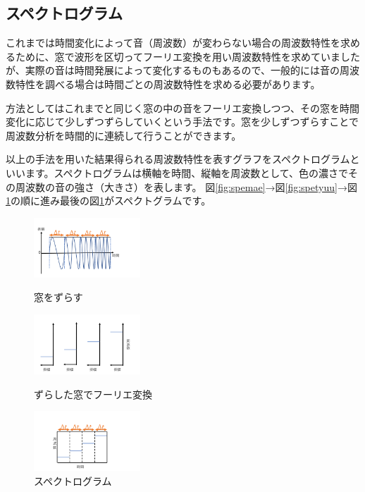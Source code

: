 \documentclass[11pt,b5paper,papersize,dvipdfmx]{jsbook}
\begin{document}
\subsection{スペクトログラム}
これまでは時間変化によって音（周波数）が変わらない場合の周波数特性を求めるために、窓で波形を区切ってフーリエ変換を用い周波数特性を求めていましたが、実際の音は時間発展によって変化するものもあるので、一般的には音の周波数特性を調べる場合は時間ごとの周波数特性を求める必要があります。\par
方法としてはこれまでと同じく窓の中の音をフーリエ変換しつつ、その窓を時間変化に応じて少しずつずらしていくという手法です。窓を少しずつずらすことで周波数分析を時間的に連続して行うことができます。\par
以上の手法を用いた結果得られる周波数特性を表すグラフをスペクトログラムといいます。スペクトログラムは横軸を時間、縦軸を周波数として、色の濃さでその周波数の音の強さ（大きさ）を表します。
図\ref{fig:spemae}→図\ref{fig:spetyuu}→図\ref{fig:spego}の順に進み最後の図\ref{fig:spego}がスペクトグラムです。
\begin{figure}[H]
  \begin{minipage}{0.32\hsize}
    \begin{center}
      \includegraphics[width=4cm]{nsmr/img/slide12.png}
    \end{center}
    \caption{窓をずらす}
    \label{fig:spemae}
  \end{minipage}
  \begin{minipage}{0.33\hsize}
    \begin{center}	
      \includegraphics[width=4cm]{nsmr/img/slide13.png}
    \end{center}  
    \caption{ずらした窓でフーリエ変換}
    \label{fig:spetyuu}
  \end{minipage}
  \begin{minipage}{0.33\hsize}
    \begin{center}
      \includegraphics[width=4cm]{nsmr/img/slide14.png}
    \end{center}
    \caption{スペクトログラム}
    \label{fig:spego}
  \end{minipage}
\end{figure}
\end{document}
